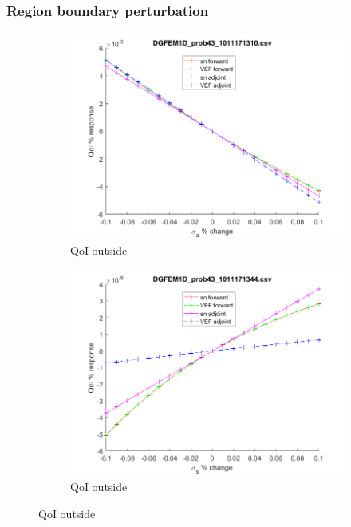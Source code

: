 \documentclass[12pt]{report}
\begin{document}
\subsubsection{Region boundary perturbation}
\begin{figure}[H]
\label{Boundaries}
\centering
\begin{subfigure}{.5\textwidth}
  \centering
  \includegraphics[width=.98\linewidth]{figures/43sigaSens.png}
  \caption{QoI outside}
  \label{fig:sfig1}
\end{subfigure}%
\begin{subfigure}{.5\textwidth}
  \centering
  \includegraphics[width=.98\linewidth]{figures/43sigsSens.png}
  \caption{QoI outside}
  \label{fig:sfig4}
\end{subfigure}%

\end{figure}
\end{document}
